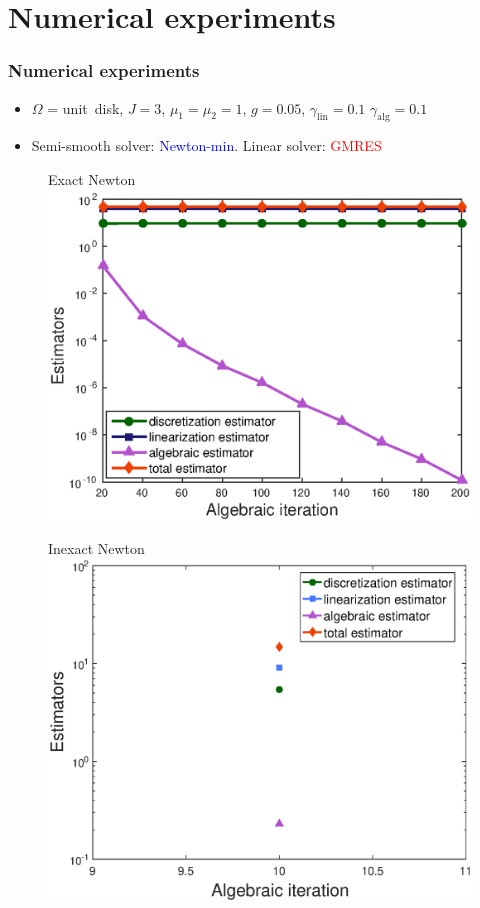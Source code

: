 \documentclass[10 pt]{beamer}
\begin{document}
\section{Numerical experiments}
\begin{frame}
\frametitle{Numerical experiments}

\begin{itemize}
\item
$\Omega$ = \mbox{unit disk}, $J = 3$, $\mu_1= \mu_2 = 1$, $g = 0.05$, $\gamma_{\mathrm{lin}}=0.1$ $\gamma_{\mathrm{alg}}=0.1$
\item 
Semi-smooth solver: \textcolor{blue}{Newton-min}. Linear solver: \textcolor{red}{GMRES}
\end{itemize}

\begin{figure}
\begin{minipage}[c]{.33\linewidth}
   \centering
   Exact Newton
\includegraphics[width=\textwidth]{fig_article/estimators_algebraic_iter_first_newton_step_exact_res_modif_2.eps}    
\end{minipage}\hfill
\begin{minipage}[c]{.33\linewidth}
   \centering
   Inexact Newton
\includegraphics[width=\textwidth]{fig_article/estimators_algebraic_iter_second_inex_newton_step_modif_2.eps}    

\end{minipage}
\end{figure}
\end{frame}
\end{document}
